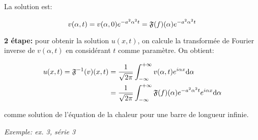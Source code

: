 \begin{enumerate}[label=\alph*)]
\begin{description}
    La solution est:
    
    \[
    v(\alpha,t) = v(\alpha,0) e^{- a^2 \alpha^2 t} = \mathfrak{F}(f)(\alpha) e^{- a^2 \alpha^2 t}
    \]
    
    \textbf{2\ieme{} étape:} pour obtenir la solution $u(x,t)$, on calcule la transformée de Fourier inverse de $v(\alpha,t)$ en considérant $t$ comme paramètre.
    On obtient:
    
    \begin{align*}
    u(x,t) = \mathfrak{F}^{-1}(v)(x,t) &=
    \frac{1}{\sqrt{2 \pi}} \int_{-\infty}^{+\infty} v(\alpha,t) e^{i\alpha x} \mathrm{d}\alpha
    \\&=
    \frac{1}{\sqrt{2 \pi}} \int_{-\infty}^{+\infty} \mathfrak{F}(f)(\alpha) e^{-a^2 \alpha^2 t} e^{i\alpha x} \mathrm{d}\alpha
    \end{align*}
    
    comme solution de l'équation de la chaleur pour une barre de longueur infinie.
    
    \textit{Exemple: ex. 3, série 3}
    \end{description}
\end{enumerate}
